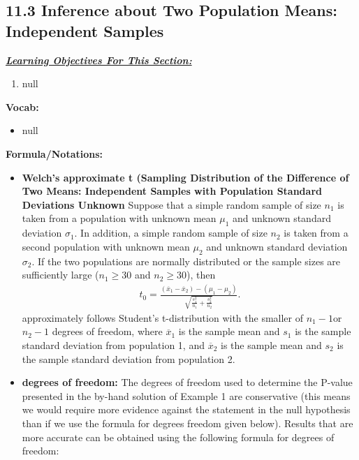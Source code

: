 \documentclass{report}
\begin{document}
    \subsection*{11.3 Inference about Two Population Means: Independent Samples}
    \bigbreak \noindent 
    \bigbreak \noindent 
    \textbf{\textit{\underline{Learning Objectives For This Section:}}}
    \begin{enumerate}
        \item null 
    \end{enumerate}
    \bigbreak \noindent 
    \textbf{Vocab:}
    \begin{itemize}
        \item null 
    \end{itemize}
    \pagebreak \bigbreak \noindent 
    \textbf{Formula/Notations:}
    \begin{itemize}
        \item \textbf{Welch's approximate t (Sampling Distribution of the Difference of Two Means: Independent Samples with Population Standard Deviations Unknown }
            Suppose that a simple random sample of size $n_1$ is taken from a population with unknown mean $\mu_1$ and unknown standard deviation $\sigma_1$. In addition, a simple random sample of size $n_2$ is taken from a second population with unknown mean $\mu_2$ and unknown standard deviation $\sigma_2$. If the two populations are normally distributed or the sample sizes are sufficiently large ($n_1 \geq 30$ and $n_2 \geq 30$), then
            \begin{align*}
                t_{0} = \frac{(\overline{x}_{1} - \overline{x}_{2}) - (\mu_{1} - \mu_{2})}{\sqrt{\frac{s_{1}^{2}}{n_{1}} + \frac{s_{2}^{2}}{n_{2}}}}
            .\end{align*}
        approximately  follows Student's t-distribution with the smaller of  $n_{1} -1 $or  $n_{2}-1 $ degrees of freedom, where $\overline{x}_{1} $ is the sample mean and $s_{1} $ is the sample standard deviation from population 1, and $\overline{x}_{2} $ is the sample mean and $s_{2}$ is the sample standard deviation from population 2.
        \item \textbf{degrees of freedom:}
            The degrees of freedom used to determine the P-value presented in the by-hand solution of Example 1 are conservative (this means we would require more evidence against the statement in the null hypothesis than if we use the formula for degrees freedom given below).
            \bigbreak \noindent 
            Results that are more accurate can be obtained using the following formula for degrees of freedom:

\end{itemize}
\end{document}
